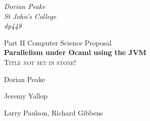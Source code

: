 \begin{titlepage}

\begin{flushright}
{\large \emph{Dorian Peake\\
      St John's College\\
      dp448}}
\end{flushright}

\vspace{3cm}

\begin{center}
{\LARGE Part II Computer Science Proposal}\\[1cm]
{\LARGE \bfseries Parallelism under Ocaml using the JVM}\\[0.5cm]
\textsc{Title not set in stone!}

\vspace{3cm}

\begin{description}
{\large
\item[Project Originator:]Dorian Peake\\[1cm]
\item[Project Supervisor:]Jeremy Yallop\\[1cm]
\item[Project Overseers:]Larry Paulson, Richard Gibbens\\[1cm]
}
\end{description}
\end{center}
\end{titlepage}
